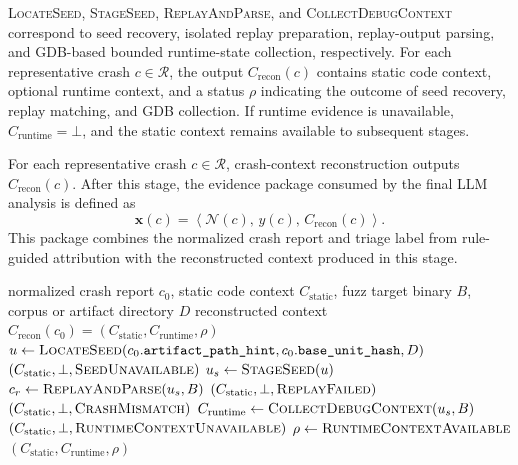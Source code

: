 \documentclass[pdflatex,sn-basic]{sn-jnl}%
\theoremstyle{thmstyleone}%
\theoremstyle{thmstyletwo}%
\theoremstyle{thmstylethree}%
\begin{document}
\textsc{LocateSeed}, \textsc{StageSeed}, \textsc{ReplayAndParse}, and \textsc{CollectDebugContext} correspond to seed recovery, isolated replay preparation, replay-output parsing, and GDB-based bounded runtime-state collection, respectively.
For each representative crash \(c\in\mathcal{R}\), the output \(C_{\mathrm{recon}}(c)\) contains static code context, optional runtime context, and a status \(\rho\) indicating the outcome of seed recovery, replay matching, and GDB collection.
If runtime evidence is unavailable, \(C_{\mathrm{runtime}}=\bot\), and the static context remains available to subsequent stages.

For each representative crash \(c\in\mathcal{R}\), crash-context reconstruction outputs \(C_{\mathrm{recon}}(c)\). After this stage, the evidence package consumed by the final LLM analysis is defined as
\begin{equation*}
\mathbf{x}(c)=
\left\langle
\mathcal{N}(c),\,y(c),\,C_{\mathrm{recon}}(c)
\right\rangle .
\end{equation*}
This package combines the normalized crash report and triage label from rule-guided attribution with the reconstructed context produced in this stage.

\begin{algorithm}[!htbp]
\caption{Runtime Context Reconstruction}
\label{alg:runtime-context}
\begin{algorithmic}
\Require normalized crash report \(c_0\), static code context \(C_{\mathrm{static}}\), fuzz target binary \(B\), corpus or artifact directory \(D\)
\Ensure reconstructed context \(C_{\mathrm{recon}}(c_0)=(C_{\mathrm{static}}, C_{\mathrm{runtime}}, \rho)\)
\State \(u \gets \Call{LocateSeed}{c_0.\texttt{artifact\_path\_hint}, c_0.\texttt{base\_unit\_hash}, D}\)
    \State \Return \((C_{\mathrm{static}}, \bot, \textsc{SeedUnavailable})\)
\EndIf
\State \(u_s \gets \Call{StageSeed}{u}\)
\State \(c_r \gets \Call{ReplayAndParse}{u_s, B}\)
    \State \Return \((C_{\mathrm{static}}, \bot, \textsc{ReplayFailed})\)
\EndIf
{}
    \State \Return \((C_{\mathrm{static}}, \bot, \textsc{CrashMismatch})\)
\EndIf
\State \(C_{\mathrm{runtime}} \gets \Call{CollectDebugContext}{u_s, B}\)
    \State \Return \((C_{\mathrm{static}}, \bot, \textsc{RuntimeContextUnavailable})\)
\EndIf
\State \(\rho \gets \textsc{RuntimeContextAvailable}\)
\State \Return \((C_{\mathrm{static}}, C_{\mathrm{runtime}}, \rho)\)
\end{algorithmic}
\end{algorithm}
\end{document}
